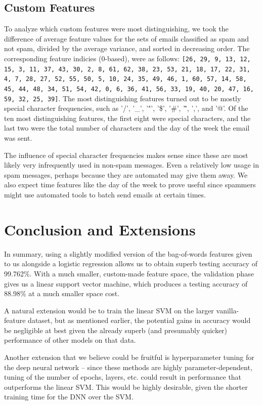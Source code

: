 \documentclass{article} %
\begin{document}
\subsection{Custom Features}
To analyze which custom features were most distinguishing, we took the difference of average feature values for the sets of emails classified as spam and not spam, divided by the average variance, and sorted in decreasing order. The corresponding feature indicies (0-based), were as follows: \lstinline|[26, 29, 9, 13, 12, 15, 3, 11, 37, 43, 30, 2, 8, 61, 62, 38, 23, 53, 21, 18, 17, 22, 31, 4, 7, 28, 27, 52, 55, 50, 5, 10, 24, 35, 49, 46, 1, 60, 57, 14, 58, 45, 44, 48, 34, 51, 54, 42, 0, 6, 36, 41, 56, 33, 19, 40, 20, 47, 16, 59, 32, 25, 39]|. The most distinguishing features turned out to be mostly special character frequencies, such as '/', '\_', '"', '\$', '#', '\^', ',', and '@'. Of the ten most distinguishing features, the first eight were special characters, and the last two were the total number of characters and the day of the week the email was sent. \par
The influence of special character frequencies makes sense since these are most likely very infrequently used in non-spam messages. Even a relatively low usage in spam messages, perhaps because they are automated may give them away. We also expect time features like the day of the week to prove useful since spammers might use automated tools to batch send emails at certain times.

\section{Conclusion and Extensions}
In summary, using a slightly modified version of the bag-of-words features given to us alongside a logistic regression allows us to obtain superb testing accuracy of 99.762\%.  With a much smaller, custom-made feature space, the validation phase gives us a linear support vector machine, which produces a testing accuracy of 88.98\% at a much smaller space cost.\par 
A natural extension would be to train the linear SVM on the larger vanilla-feature dataset, but as mentioned earlier, the potential gains in accuracy would be negligible at best given the already superb (and presumably quicker) performance of other models on that data.\par 
Another extension that we believe could be fruitful is hyperparameter tuning for the deep neural network -- since these methods are highly parameter-dependent, tuning of the number of epochs, layers, etc. could result in performance that outperforms the linear SVM.  This would be highly desirable, given the shorter training time for the DNN over the SVM.
\end{document}
